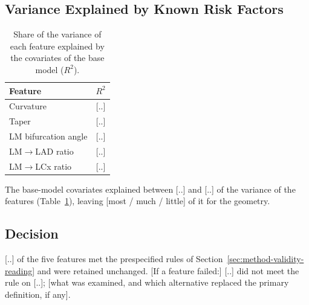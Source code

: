 \subsection{Variance Explained by Known Risk Factors}
\label{sec:results-validity-split}

\begin{table}[htbp]
  \centering
  \caption{Share of the variance of each feature explained by the covariates of the base model ($R^2$).}
  \label{tab:results-validity-split}
  \footnotesize
  \begin{tabular}{lc}
    \toprule
    Feature & $R^2$ \\
    \midrule
    Curvature & [..] \\
    Taper & [..] \\
    LM bifurcation angle & [..] \\
    LM$\to$LAD ratio & [..] \\
    LM$\to$LCx ratio & [..] \\
    \bottomrule
  \end{tabular}
\end{table}

The base-model covariates explained between [..] and [..] of the variance of the features (Table~\ref{tab:results-validity-split}), leaving [most / much / little] of it for the geometry.

\subsection{Decision}
\label{sec:results-validity-decision}

[..] of the five features met the prespecified rules of Section~\ref{sec:method-validity-reading} and were retained unchanged.
[If a feature failed:] [..] did not meet the rule on [..]; [what was examined, and which alternative replaced the primary definition, if any].
